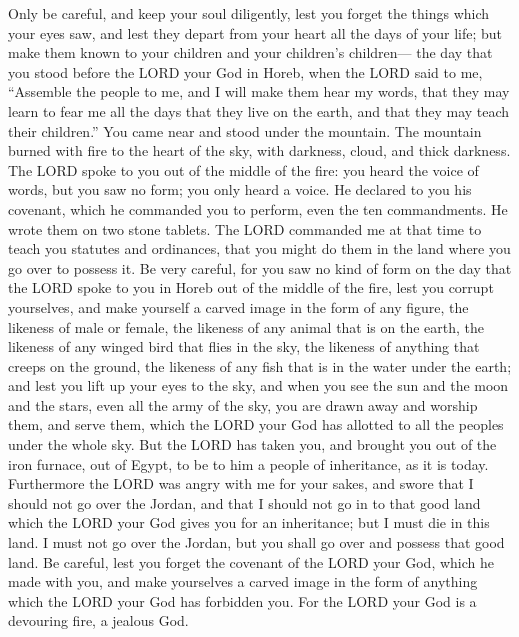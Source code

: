 \myverse{}Only be careful, and keep your soul diligently, lest you forget
the things which your eyes saw, and lest they depart from your heart all the days of your life; but make
them known to your children and your children’s children—
\myverse{}the day that you stood before the LORD your God in Horeb, when the LORD said
to me, “Assemble the people to me, and I will make them hear my words, that they may learn to fear me
all the days that they live on the earth, and that they may teach their children.”
\myverse{}You came near and stood under the mountain. The mountain burned with fire
to the heart of the sky, with darkness, cloud, and thick darkness.
\myverse{}The LORD spoke to you out of the middle of the fire: you heard the voice of
words, but you saw no form; you only heard a voice.
\myverse{}He declared to you his covenant, which he commanded you to perform, even the
ten commandments. He wrote them on two stone tablets.
\myverse{}The LORD commanded me at that time to teach you statutes and ordinances, that
you might do them in the land where you go over to possess it.
\myverse{}Be very careful, for you saw no kind of form on the day that the LORD spoke
to you in Horeb out of the middle of the fire,
\myverse{}lest you corrupt yourselves, and make yourself a carved image in the form
of any figure, the likeness of male or female,
\myverse{}the likeness of any animal that is on the earth, the likeness of any winged
bird that flies in the sky,
\myverse{}the likeness of anything that creeps on the ground, the likeness of any fish
that is in the water under the earth;
\myverse{}and lest you lift up your eyes to the sky, and when you see the sun and the
moon and the stars, even all the army of the sky, you are drawn away and worship them, and serve them,
which the LORD your God has allotted to all the peoples under the whole sky.
\myverse{}But the LORD has taken you, and brought you out of the iron furnace, out of
Egypt, to be to him a people of inheritance, as it is today.
\myverse{}Furthermore the LORD was angry with me for your sakes, and swore that I should
not go over the Jordan, and that I should not go in to that good land which the LORD your God gives you
for an inheritance;
\myverse{}but I must die in this land. I must not go over the Jordan, but you shall
go over and possess that good land.
\myverse{}Be careful, lest you forget the covenant of the LORD your God, which he made
with you, and make yourselves a carved image in the form of anything which the LORD your God has forbidden
you.
\myverse{}For the LORD your God is a devouring fire, a jealous God.
